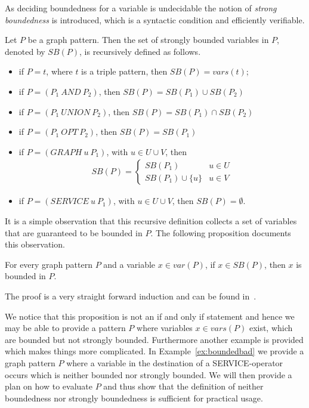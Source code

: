 As deciding boundedness for a variable is undecidable the notion of
\emph{strong boundedness} is introduced, which is a syntactic condition and
efficiently verifiable. 

\begin{definition}\label{def:strongboundedness}
	Let $P$ be a graph pattern. Then the set of strongly bounded variables in $P$,
	denoted by $SB(P)$, is recursively defined as follows.

	\begin{itemize}
		\item if $P =t$, where $t$ is a triple pattern, then $SB(P) = vars(t)$;
		\item if $P = (P_1 \ AND \ P_2)$, then $SB(P) = SB(P_1) \cup SB(P_2)$ 
		\item if $P = (P_1  \ UNION \ P_2)$, then $SB(P) = SB(P_1) \cap SB(P_2)$ 
		\item if $P = (P_1 \ OPT \ P_2)$, then $SB(P) = SB(P_1)$ 
		\item if $P = (GRAPH \ u \ P_1)$, with $u \in U\cup V$, 
			then\\
			\begin{align*}
				SB(P) = 
				\begin{cases}
					SB(P_1) & \mbox{$u \in U$} \\
					SB(P_1) \cup \{u\} &\mbox{$u \in V$} 
				\end{cases}
			\end{align*}

		\item if $P = (SERVICE \ u \ P_1)$, with $u \in U \cup V$, then $SB(P) = \emptyset$.
	\end{itemize}
\end{definition}

It is a simple observation that this recursive definition collects a set of
variables that are guaranteed to be bounded in $P$. The following proposition
documents this observation.

\begin{proposition}\label{sbinb}
	For every graph pattern $P$ and a variable $x \in var(P)$, if $x \in SB(P)$,
	then $x$ is bounded in $P$.
\end{proposition}
The proof is a very straight forward induction and can be found
in~\cite[Appendix A]{BuilAranda20131}.

We notice that this proposition is not an if and only if statement and hence we may be
able to provide a pattern $P$ where variables $x \in vars(P)$ exist, which are
bounded but not
strongly bounded. Furthermore another example is provided which makes things more
complicated. In Example~\ref{ex:boundedbad} we provide a graph pattern $P$ where a variable in the
destination of a SERVICE-operator occurs which is neither bounded nor strongly
bounded. We will then provide a plan on how to evaluate $P$ and thus show that
the definition of neither boundedness nor strongly boundedness is sufficient for
practical usage. 


